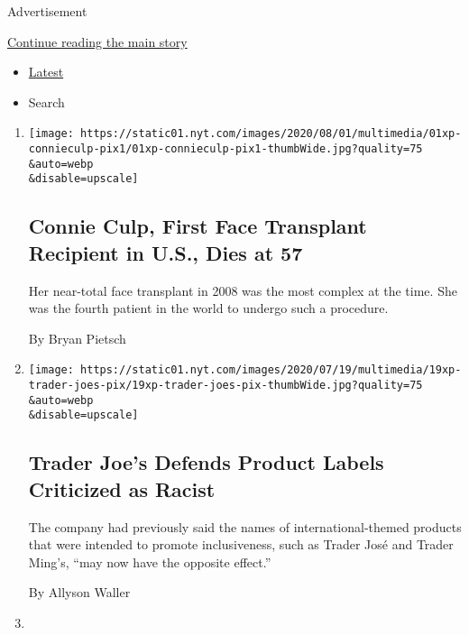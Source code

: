 Advertisement

\protect\hyperlink{after-mid1}{Continue reading the main story}

\begin{itemize}
\tightlist
\item
  \protect\hyperlink{stream-panel}{Latest}
\item
  Search
\end{itemize}

\begin{enumerate}
\def\labelenumi{\arabic{enumi}.}
\item
  \href{/2020/08/01/us/Connie-culp-dead-face-transplant.html}{}

  \texttt{[image: https://static01.nyt.com/images/2020/08/01/multimedia/01xp-connieculp-pix1/01xp-connieculp-pix1-thumbWide.jpg?quality=75\\\&auto=webp\\\&disable=upscale]}

  \hypertarget{connie-culp-first-face-transplant-recipient-in-us-dies-at-57}{%
  \subsection{Connie Culp, First Face Transplant Recipient in U.S., Dies
  at
  57}\label{connie-culp-first-face-transplant-recipient-in-us-dies-at-57}}

  Her near-total face transplant in 2008 was the most complex at the
  time. She was the fourth patient in the world to undergo such a
  procedure.

  By Bryan Pietsch
\item
  \href{/2020/08/01/us/trader-joes-jose-ming-joe-san.html}{}

  \texttt{[image: https://static01.nyt.com/images/2020/07/19/multimedia/19xp-trader-joes-pix/19xp-trader-joes-pix-thumbWide.jpg?quality=75\\\&auto=webp\\\&disable=upscale]}

  \hypertarget{trader-joes-defends-product-labels-criticized-as-racist}{%
  \subsection{Trader Joe's Defends Product Labels Criticized as
  Racist}\label{trader-joes-defends-product-labels-criticized-as-racist}}

  The company had previously said the names of international-themed
  products that were intended to promote inclusiveness, such as Trader
  José and Trader Ming's, ``may now have the opposite effect.''

  By Allyson Waller
\item
  \href{/2020/08/01/us/politics/alexander-vindman-impeachment-trump.html}{}


\end{enumerate}
